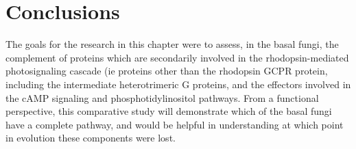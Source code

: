 \section{Conclusions}
The goals for the research in this chapter were to assess, in the basal fungi, the complement of proteins which are secondarily involved in the rhodopsin-mediated photosignaling cascade (ie proteins other than the rhodopsin GCPR protein, including the intermediate heterotrimeric G proteins, and the effectors involved in the cAMP signaling and phosphotidylinositol pathways. From a functional perspective, this comparative study will demonstrate which of the basal fungi have a complete pathway, and would be helpful in understanding at which point in evolution these components were lost.\\
\indent \\

